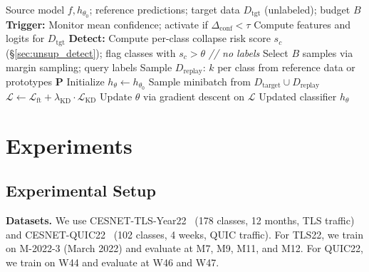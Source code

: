 \documentclass[journal]{IEEEtran}
\newcommand{\ours}{CARE}  %
\begin{document}
\begin{algorithm}[t]
\caption{\ours{}: Collapse-Aware Active Repair}
\label{alg:care}
\begin{algorithmic}[1]
\REQUIRE Source model $f, h_{\theta_0}$; reference predictions; target data $D_{\text{tgt}}$ (unlabeled); budget $B$
\STATE \textbf{Trigger:} Monitor mean confidence; activate if $\Delta_{\text{conf}} < \tau$
\STATE Compute features and logits for $D_{\text{tgt}}$
\STATE \textbf{Detect:} Compute per-class collapse risk score $s_c$ (\S\ref{sec:unsup_detect}); flag classes with $s_c > \theta$ \hfill \textit{// no labels}
\STATE Select $B$ samples via margin sampling; query labels
\STATE Sample $D_{\text{replay}}$: $k$ per class from reference data or prototypes $\mathbf{P}$
\STATE Initialize $h_\theta \leftarrow h_{\theta_0}$
  \STATE Sample minibatch from $D_{\text{target}} \cup D_{\text{replay}}$
  \STATE $\mathcal{L} \leftarrow \mathcal{L}_{\text{ft}} + \lambda_{\text{KD}} \cdot \mathcal{L}_{\text{KD}}$
  \STATE Update $\theta$ via gradient descent on $\mathcal{L}$
\ENDFOR
\RETURN Updated classifier $h_\theta$
\end{algorithmic}
\end{algorithm}


\section{Experiments}
\label{sec:experiments}

\subsection{Experimental Setup}

\textbf{Datasets.}
We use CESNET-TLS-Year22~\cite{hynek2024cesnet} (178 classes, 12 months, TLS traffic) and CESNET-QUIC22~\cite{luxemburk2023quic} (102 classes, 4 weeks, QUIC traffic).
For TLS22, we train on M-2022-3 (March 2022) and evaluate at M7, M9, M11, and M12.
For QUIC22, we train on W44 and evaluate at W46 and W47.
\end{document}
